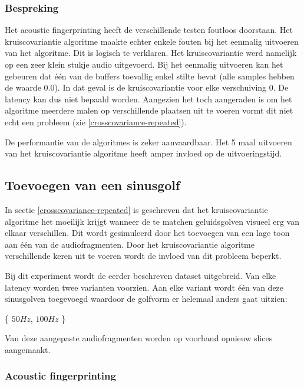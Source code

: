 \subsubsection{Bespreking}

Het acoustic fingerprinting heeft de verschillende testen foutloos doorstaan. Het kruiscovariantie algoritme maakte echter enkele fouten bij het eenmalig uitvoeren van het algoritme. Dit is logisch te verklaren. Het kruiscovariantie werd namelijk op een zeer klein stukje audio uitgevoerd. Bij het eenmalig uitvoeren kan het gebeuren dat één van de buffers toevallig enkel stilte bevat (alle samples hebben de waarde 0.0). In dat geval is de kruiscovariantie voor elke verschuiving 0. De latency kan dus niet bepaald worden. Aangezien het toch aangeraden is om het algoritme meerdere malen op verschillende plaatsen uit te voeren vormt dit niet echt een probleem (zie \ref{crosscovariance-repeated}).

De performantie van de algoritmes is zeker aanvaardbaar. Het 5 maal uitvoeren van het kruiscovariantie algoritme heeft amper invloed op de uitvoeringstijd.

\subsection{Toevoegen van een sinusgolf}
\label{sine-test}

In sectie \ref{crosscovariance-repeated} is geschreven dat het kruiscovariantie algoritme het moeilijk krijgt wanneer de te matchen geluidsgolven visueel erg van elkaar verschillen. Dit wordt gesimuleerd door het toevoegen van een lage toon aan één van de audiofragmenten. Door het kruiscovariantie algoritme verschillende keren uit te voeren wordt de invloed van dit probleem beperkt.

Bij dit experiment wordt de eerder beschreven dataset uitgebreid. Van elke latency worden twee varianten voorzien. Aan elke variant wordt één van deze sinusgolven toegevoegd waardoor de golfvorm er helemaal anders gaat uitzien:

\begin{center}
	\{ $50Hz$, $100Hz$ \}
\end{center}

Van deze aangepaste audiofragmenten worden op voorhand opnieuw slices aangemaakt. 

\subsubsection{Acoustic fingerprinting}

